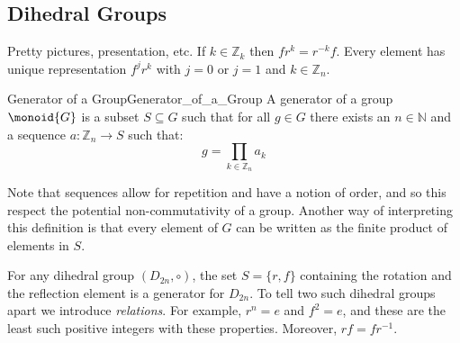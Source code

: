 \documentclass{article}                                                        %
\begin{document}
        \subsection{Dihedral Groups}
            Pretty pictures, presentation, etc. If $k\in\mathbb{Z}_{k}$ then
            $fr^{k}=r^{\minus{k}}f$. Every element has unique representation
            $f^{j}r^{k}$ with $j=0$ or $j=1$ and $k\in\mathbb{Z}_{n}$.
            \begin{fdefinition}{Generator of a Group}{Generator_of_a_Group}
                A generator of a group $\monoid{G}$ is a subset $S\subseteq{G}$
                such that for all $g\in{G}$ there exists an $n\in\mathbb{N}$ and
                a sequence $a:\mathbb{Z}_{n}\rightarrow{S}$ such that:
                \begin{equation*}
                    g=\prod_{k\in\mathbb{Z}_{n}}a_{k}
                \end{equation*}
            \end{fdefinition}
            Note that sequences allow for repetition and have a notion of order,
            and so this respect the potential non-commutativity of a group.
            Another way of interpreting this definition is that every element of
            $G$ can be written as the finite product of elements in $S$.
            \begin{example}
                For any dihedral group $(D_{2n},\circ)$, the set
                $S=\{r,f\}$ containing the rotation and the reflection element
                is a generator for $D_{2n}$. To tell two such dihedral groups
                apart we introduce \textit{relations}. For example, $r^{n}=e$
                and $f^{2}=e$, and these are the least such positive integers
                with these properties. Moreover, $rf=fr^{\minus{1}}$.
            \end{example}
\end{document}
